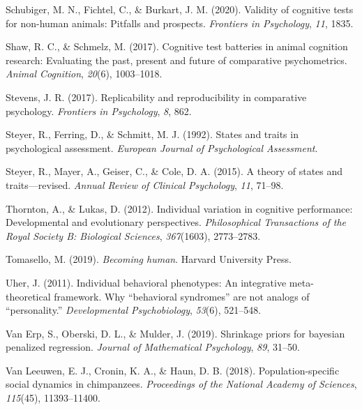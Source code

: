 \documentclass[
  man,floatsintext]{apa6}
\newlength{\cslhangindent}
\newlength{\cslentryspacingunit} %
\newenvironment{CSLReferences}[2] %
 {%
  \setlength{\parindent}{0pt}
  \ifodd #1
  \let\oldpar\par
  \def\par{\hangindent=\cslhangindent\oldpar}
  \fi
  \setlength{\parskip}{#2\cslentryspacingunit}
 }%
 {}
\begin{document}
\begin{CSLReferences}{1}{0}
\leavevmode{}%
Schubiger, M. N., Fichtel, C., \& Burkart, J. M. (2020). Validity of cognitive tests for non-human animals: Pitfalls and prospects. \emph{Frontiers in Psychology}, \emph{11}, 1835.

\leavevmode{}%
Shaw, R. C., \& Schmelz, M. (2017). Cognitive test batteries in animal cognition research: Evaluating the past, present and future of comparative psychometrics. \emph{Animal Cognition}, \emph{20}(6), 1003--1018.

\leavevmode{}%
Stevens, J. R. (2017). Replicability and reproducibility in comparative psychology. \emph{Frontiers in Psychology}, \emph{8}, 862.

\leavevmode{}%
Steyer, R., Ferring, D., \& Schmitt, M. J. (1992). States and traits in psychological assessment. \emph{European Journal of Psychological Assessment}.

\leavevmode{}%
Steyer, R., Mayer, A., Geiser, C., \& Cole, D. A. (2015). A theory of states and traits---revised. \emph{Annual Review of Clinical Psychology}, \emph{11}, 71--98.

\leavevmode{}%
Thornton, A., \& Lukas, D. (2012). Individual variation in cognitive performance: Developmental and evolutionary perspectives. \emph{Philosophical Transactions of the Royal Society B: Biological Sciences}, \emph{367}(1603), 2773--2783.

\leavevmode{}%
Tomasello, M. (2019). \emph{Becoming human}. Harvard University Press.

\leavevmode{}%
Uher, J. (2011). Individual behavioral phenotypes: An integrative meta-theoretical framework. Why {``behavioral syndromes''} are not analogs of {``personality.''} \emph{Developmental Psychobiology}, \emph{53}(6), 521--548.

\leavevmode{}%
Van Erp, S., Oberski, D. L., \& Mulder, J. (2019). Shrinkage priors for bayesian penalized regression. \emph{Journal of Mathematical Psychology}, \emph{89}, 31--50.

\leavevmode{}%
Van Leeuwen, E. J., Cronin, K. A., \& Haun, D. B. (2018). Population-specific social dynamics in chimpanzees. \emph{Proceedings of the National Academy of Sciences}, \emph{115}(45), 11393--11400.


\end{CSLReferences}
\end{document}
